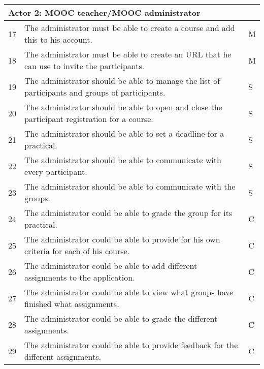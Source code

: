 \begin{tabular}{ | p{0.5cm} | p{12cm} | p{2cm} | }
\hline
\multicolumn{3}{|p{14.5cm}|}{\textbf{Actor 2: MOOC teacher/MOOC administrator}} \\ \hline
17 & The administrator must be able to create a course and add this to his account. & M \\ \hline
18 & The administrator must be able to create an URL that he can use to invite the participants. & M \\ \hline
19 & The administrator should be able to manage the list of participants and groups of participants. & S \\ \hline
20 & The administrator should be able to open and close the participant registration for a course. & S \\ \hline
21 & The administrator should be able to set a deadline for a practical. & S \\ \hline
22 & The administrator should be able to communicate with every participant. & S \\ \hline
23 & The administrator should be able to communicate with the groups. & S \\ \hline
24 & The administrator could be able to grade the group for its practical. & C \\ \hline
25 & The administrator could be able to provide for his own criteria for each of his course. & C \\ \hline
26 & The administrator could be able to add different assignments to the application. & C \\ \hline
27 & The administrator could be able to view what groups have finished what assignments. & C \\ \hline
28 & The administrator could be able to grade the different assignments. & C \\ \hline
29 & The administrator could be able to provide feedback for the different assignments. & C \\ \hline
\end{tabular}

